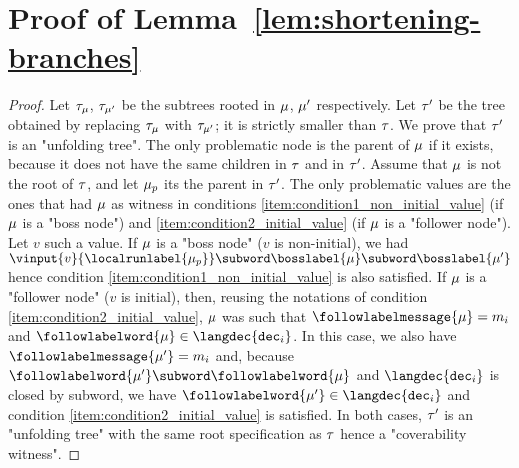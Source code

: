 \section{Proof of Lemma~\ref{lem:shortening-branches}}
\label{app:proofs-reduction-branches}

\lemShorteningBranches*

\begin{proof}
	Let $\tau_{\mu}$, $\tau_{\mu'}$ be the subtrees rooted in $\mu$, $\mu'$ respectively. 
	Let $\tau'$ be the tree obtained by replacing $\tau_{\mu}$ with $\tau_{\mu'}$; it is strictly smaller than $\tau$. We prove that $\tau'$ is an "unfolding tree".
	The only problematic node is the parent of $\mu$ if it exists, because it does not have the same children in $\tau$ and in $\tau'$. Assume that $\mu$ is not the root of $\tau$, and let $\mu_p$ its the parent in $\tau'$.
	The only problematic values are the ones that had $\mu$ as witness in conditions \ref{item:condition1_non_initial_value} (if $\mu$ is a "boss node") and \ref{item:condition2_initial_value} (if $\mu$ is a "follower node"). Let $v$ such a value. 
	If $\mu$ is a "boss node" ($v$ is non-initial), we had $\vinput{v}{\localrunlabel{\node_p}} \subword \bosslabel{\node} \subword \bosslabel{\node'}$ hence condition \ref{item:condition1_non_initial_value} is also satisfied. If $\mu$ is a "follower node" ($v$ is initial), then, reusing the notations of condition \ref{item:condition2_initial_value}, $\mu$ was such that $\followlabelmessage{\node} = m_i$ and $\followlabelword{\node} \in \langdec{\decsymb_i}$. In this case, we also have $\followlabelmessage{\node'} = m_i$ and, because $\followlabelword{\node'} \subword \followlabelword{\node}$ and $\langdec{\decsymb_i}$ is closed by subword, we have $\followlabelword{\node'} \in \langdec{\decsymb_i}$ and condition \ref{item:condition2_initial_value} is satisfied. In both cases, $\tau'$ is an "unfolding tree" with the same root specification as $\tau$ hence a "coverability witness".

\end{proof}

